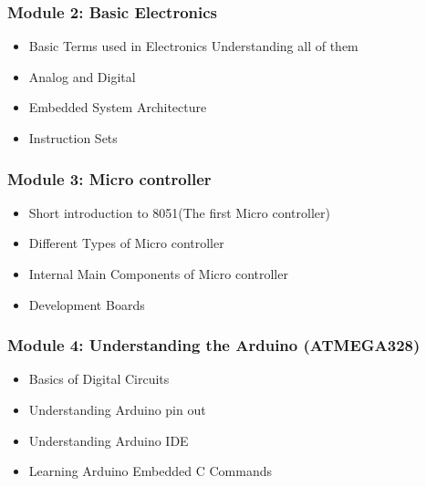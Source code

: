 \documentclass[12pt]{article}
\begin{document}
\subsubsection*{Module 2: Basic Electronics}
\begin{itemize}
  \item Basic Terms used in Electronics Understanding all of them
  \item Analog and Digital
  \item Embedded System Architecture
   \item Instruction Sets
\end{itemize}

\subsubsection*{Module 3: Micro controller}
\begin{itemize}
  \item Short introduction to 8051(The first Micro controller)
  \item Different Types of Micro controller
  \item Internal Main Components of Micro controller
   \item Development Boards
\end{itemize}

\subsubsection*{Module 4: Understanding the Arduino (ATMEGA328)}
\begin{itemize}
  \item Basics of Digital Circuits
  \item Understanding Arduino pin out
  \item Understanding Arduino IDE
   \item Learning Arduino Embedded C Commands
\end{itemize}
\end{document}

